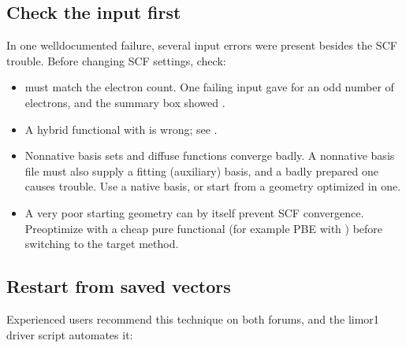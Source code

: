 \documentclass[letterpaper,10pt,english,openany,oneside]{sphinxmanual}
\begin{document}
\subsection{Check the input first}
\label{\detokenize{troubleshooting/common-problems:check-the-input-first}}
\sphinxAtStartPar
In one well\sphinxhyphen{}documented failure, several input errors were present besides the SCF trouble. Before changing SCF
settings, check:
\begin{itemize}
\item {} 
\sphinxAtStartPar
{} {\hyperref[\detokenize{reference/molecule:molecule-mult}]{}} must match the electron count. One failing input gave  for
an odd number of electrons, and the summary box showed .

\item {} 
\sphinxAtStartPar
{} A hybrid functional with  is wrong; see
{\hyperref[\detokenize{troubleshooting/common-problems:troubleshooting-hybrid}]{}}.

\item {} 
\sphinxAtStartPar
{} Non\sphinxhyphen{}native basis sets and diffuse functions converge badly. A non\sphinxhyphen{}native basis file must also supply a
fitting (auxiliary) basis, and a badly prepared one causes trouble. Use a native basis, or start from a geometry
optimized in one.

\item {} 
\sphinxAtStartPar
{} A very poor starting geometry can by itself prevent SCF convergence. Pre\sphinxhyphen{}optimize with a cheap pure
functional (for example PBE with ) before switching to the target method.

\end{itemize}




\subsection{Restart from saved vectors}
\label{\detokenize{troubleshooting/common-problems:restart-from-saved-vectors}}
\sphinxAtStartPar
Experienced users recommend this technique on both forums, and the limor1  driver script automates it:
\end{document}
